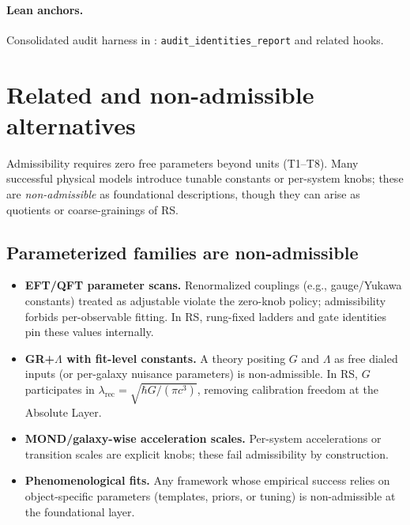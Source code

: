 \documentclass[11pt]{article}
\begin{document}
\paragraph{Lean anchors.} Consolidated audit harness in : \texttt{audit\_identities\_report} and related hooks.

\section{Related and non\mbox{-}admissible alternatives}
Admissibility requires zero free parameters beyond units (T1--T8). Many successful physical models introduce tunable constants or per\mbox{-}system knobs; these are \emph{non\mbox{-}admissible} as foundational descriptions, though they can arise as quotients or coarse\mbox{-}grainings of RS.

\subsection{Parameterized families are non\mbox{-}admissible}
\begin{itemize}
  \item \textbf{EFT/QFT parameter scans.} Renormalized couplings (e.g., gauge/Yukawa constants) treated as adjustable violate the zero\mbox{-}knob policy; admissibility forbids per\mbox{-}observable fitting. In RS, rung\mbox{-}fixed ladders and gate identities pin these values internally.
  \item \textbf{GR+\(\Lambda\) with fit\mbox{-}level constants.} A theory positing \(G\) and \(\Lambda\) as free dialed inputs (or per\mbox{-}galaxy nuisance parameters) is non\mbox{-}admissible. In RS, \(G\) participates in \(\lambda_{\mathrm{rec}}=\sqrt{\hbar G/(\pi c^3)}\), removing calibration freedom at the Absolute Layer.
  \item \textbf{MOND/galaxy\mbox{-}wise acceleration scales.} Per\mbox{-}system accelerations or transition scales are explicit knobs; these fail admissibility by construction.
  \item \textbf{Phenomenological fits.} Any framework whose empirical success relies on object\mbox{-}specific parameters (templates, priors, or tuning) is non\mbox{-}admissible at the foundational layer.
\end{itemize}
\end{document}
